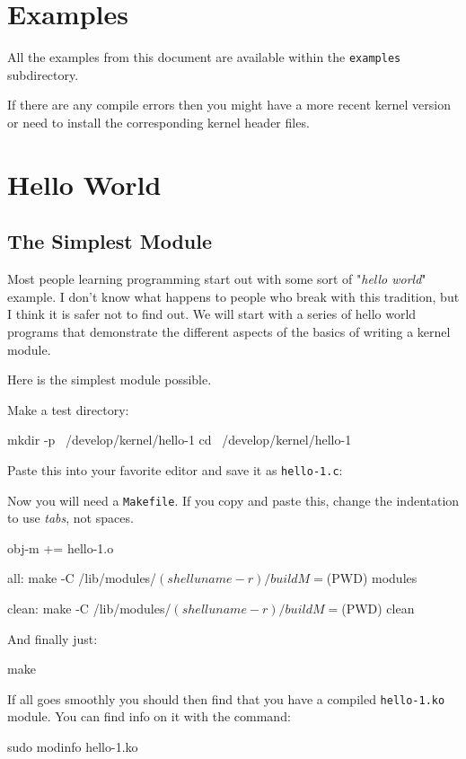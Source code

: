 \documentclass[10pt, oneside]{book}
\begin{document}
\section{Examples}
\label{sec:examples}
All the examples from this document are available within the \verb|examples| subdirectory.

If there are any compile errors then you might have a more recent kernel version or need to install the corresponding kernel header files.

\section{Hello World}
\label{sec:helloworld}
\subsection{The Simplest Module}
\label{sec:org2d3e245}
Most people learning programming start out with some sort of "\emph{hello world}" example.
I don't know what happens to people who break with this tradition, but I think it is safer not to find out.
We will start with a series of hello world programs that demonstrate the different aspects of the basics of writing a kernel module.

Here is the simplest module possible.

Make a test directory:
\begin{codebash}
mkdir -p ~/develop/kernel/hello-1
cd ~/develop/kernel/hello-1
\end{codebash}

Paste this into your favorite editor and save it as \verb|hello-1.c|:


Now you will need a \verb|Makefile|. If you copy and paste this, change the indentation to use \textit{tabs}, not spaces.

\begin{code}
obj-m += hello-1.o

all:
	make -C /lib/modules/$(shell uname -r)/build M=$(PWD) modules

clean:
	make -C /lib/modules/$(shell uname -r)/build M=$(PWD) clean
\end{code}

And finally just:
\begin{codebash}
make
\end{codebash}

If all goes smoothly you should then find that you have a compiled \verb|hello-1.ko| module.
You can find info on it with the command:
\begin{codebash}
sudo modinfo hello-1.ko
\end{codebash}
\end{document}
